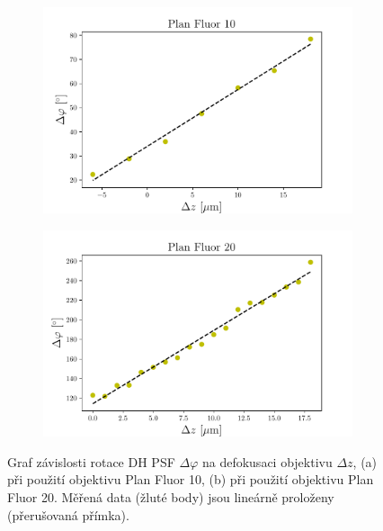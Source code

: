 \documentclass[12pt, a4paper,
    twoside,        %
    openright
]{report}
\begin{document}
\begin{figure}[h] \centering
    \begin{subfigure}{0.63\textwidth} %
      \includegraphics[width=\textwidth]{imgs/vysledek_10}
      \caption{} %
    \end{subfigure}
    \begin{subfigure}{0.63\textwidth}
      \includegraphics[width=\textwidth]{imgs/vysledek_20}
      \caption{}
    \end{subfigure}
    \caption[Graf závislosti rotace DH PSF $\Delta\varphi$ na defokusaci objektivu $\Delta z$.]{Graf závislosti rotace DH PSF $\Delta\varphi$ na defokusaci objektivu $\Delta z$, (a) při použití objektivu Plan Fluor 10, (b) při použití objektivu Plan Fluor 20. Měřená data (žluté body) jsou lineárně proloženy (přerušovaná přímka). }
    \label{fig:rotace_grafy}
\end{figure}
\end{document}
